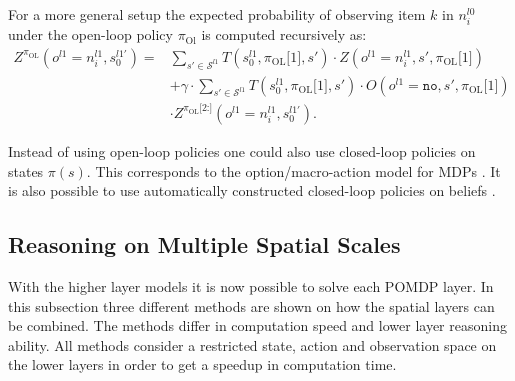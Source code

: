 For a more general setup the expected probability of observing item $k$ in $n_i^{l0}$ under the open-loop policy $\pi_\text{Ol}$ is computed recursively as:
\begin{equation}
    \begin{aligned}
        Z^{\pi_\text{OL}}\left( o^{l1}=n_i^{l1}, s_0^{l1\prime}\right) = &\sum_{s'\in\mathcal{S}^{l1}} T\left( s_0^{l1}, \pi_\text{OL}\texttt{[$1$]}, s' \right) \cdot Z\left(o^{l1}=n_i^{l1}, s', \pi_\text{OL}\texttt{[$1$]}\right) \\
        &+ \gamma \cdot \sum_{s'\in\mathcal{S}^{l1}} T\left( s_0^{l1}, \pi_\text{OL}\texttt{[$1$]}, s' \right) \cdot O\left( o^{l1}=\texttt{no}, s', \pi_\text{OL}\texttt{[$1$]} \right)\\
        &\cdot Z^{\pi_\text{OL}\texttt{[$2$:]}}\left( o^{l1}=n_i^{l1}, s_0^{l1'} \right).
    \end{aligned}
\end{equation}

Instead of using open-loop policies one could also use closed-loop policies on states $\pi(s)$. This corresponds to the option/macro-action model for MDPs \cite{SUTTON1999181, DBLP:journals/corr/abs-1301-7381}. It is also possible to use automatically constructed closed-loop policies on beliefs \cite{7140035}.


\subsection{Reasoning on Multiple Spatial Scales}\label{sec:M1toM3}
With the higher layer models it is now possible to solve each POMDP layer. In this subsection three different methods are shown on how the spatial layers can be combined. The methods differ in computation speed and lower layer reasoning ability. 
All methods consider a restricted state, action and observation space on the lower layers in order to get a speedup in computation time. 
%
